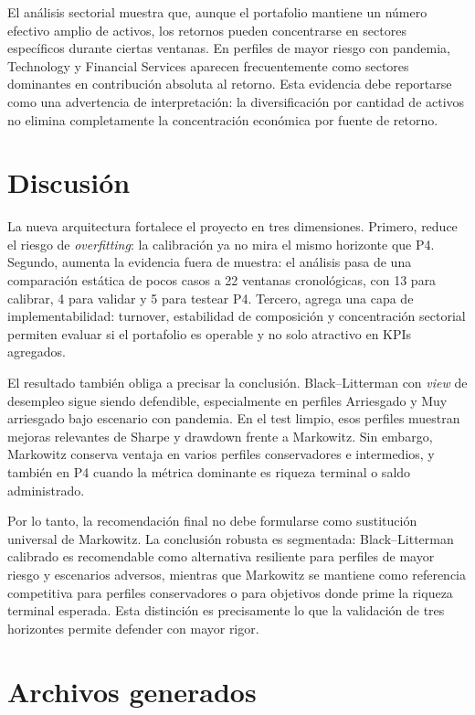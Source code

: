 \documentclass[11pt]{article}
\begin{document}
El an\'alisis sectorial muestra que, aunque el portafolio mantiene un n\'umero efectivo amplio de activos, los retornos pueden concentrarse en sectores espec\'ificos durante ciertas ventanas. En perfiles de mayor riesgo con pandemia, Technology y Financial Services aparecen frecuentemente como sectores dominantes en contribuci\'on absoluta al retorno. Esta evidencia debe reportarse como una advertencia de interpretaci\'on: la diversificaci\'on por cantidad de activos no elimina completamente la concentraci\'on econ\'omica por fuente de retorno.

\section{Discusi\'on}

La nueva arquitectura fortalece el proyecto en tres dimensiones. Primero, reduce el riesgo de \textit{overfitting}: la calibraci\'on ya no mira el mismo horizonte que P4. Segundo, aumenta la evidencia fuera de muestra: el an\'alisis pasa de una comparaci\'on est\'atica de pocos casos a 22 ventanas cronol\'ogicas, con 13 para calibrar, 4 para validar y 5 para testear P4. Tercero, agrega una capa de implementabilidad: turnover, estabilidad de composici\'on y concentraci\'on sectorial permiten evaluar si el portafolio es operable y no solo atractivo en KPIs agregados.

El resultado tambi\'en obliga a precisar la conclusi\'on. Black--Litterman con \textit{view} de desempleo sigue siendo defendible, especialmente en perfiles Arriesgado y Muy arriesgado bajo escenario con pandemia. En el test limpio, esos perfiles muestran mejoras relevantes de Sharpe y drawdown frente a Markowitz. Sin embargo, Markowitz conserva ventaja en varios perfiles conservadores e intermedios, y tambi\'en en P4 cuando la m\'etrica dominante es riqueza terminal o saldo administrado.

Por lo tanto, la recomendaci\'on final no debe formularse como sustituci\'on universal de Markowitz. La conclusi\'on robusta es segmentada: Black--Litterman calibrado es recomendable como alternativa resiliente para perfiles de mayor riesgo y escenarios adversos, mientras que Markowitz se mantiene como referencia competitiva para perfiles conservadores o para objetivos donde prime la riqueza terminal esperada. Esta distinci\'on es precisamente lo que la validaci\'on de tres horizontes permite defender con mayor rigor.

\section{Archivos generados}
\end{document}
